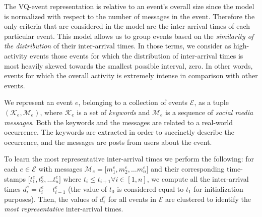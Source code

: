 
The VQ-event representation is relative to an event's overall size since the
model is normalized with respect to the number of messages in the event.
%
Therefore the only criteria that are considered in the model are the
inter-arrival times of each particular event. 
%
This model allows us to group events based on the {\em similarity of the
distribution} of their inter-arrival times. 
%
In those terms, we consider as high-activity events those events for which the
distribution of inter-arrival times is most heavily skewed towards the smallest
possible interval, zero. 
%
In other words, events for which the overall activity is extremely intense in
comparison with other events.


We represent an event $\mathit{e}$, belonging to a collection of events
$\mathcal{E}$, as a tuple $(\mathcal{K}_\mathit{e}, \mathcal{M}_\mathit{e})$,
where $\mathcal{K}_\mathit{e}$ is a set of \emph{keywords} and
$\mathcal{M}_\mathit{e}$ is a sequence of \emph{social media messages}.
%
Both the keywords and the messages are related to a real-world occurrence. 
%
The keywords are extracted in order to succinctly describe the occurrence, and
the messages are posts from users about the event.


To learn the most representative inter-arrival times we perform the following:
%
for each $\mathit{e} \in \mathcal{E}$ with messages $\mathcal{M}_\mathit{e} =
\lbrack m_{1}^\mathit{e}, m_{2}^\mathit{e}, \ldots m_{n}^\mathit{e} \rbrack$ and
their corresponding time-stamps $\lbrack t_{1}^\mathit{e}, t_{2}^\mathit{e},
\ldots t_{n}^\mathit{e} \rbrack$ where $t_{\mathit{i}} \leq t_{\mathit{i}+1}
\forall \mathit{i} \in [1,n]$, we compute all the inter-arrival times
$d_{\mathit{i}}^\mathit{e} =
t_{\mathit{i}}^\mathit{e}-t_{\mathit{i}-1}^\mathit{e}$ (the value of $t_{0}$ is
considered equal to $t_{1}$ for initialization purposes). 
%
Then, the values of $d_{\mathit{i}}^\mathit{e}$ for all events in $\mathcal{E}$
are clustered to identify the {\em most representative} inter-arrival times.



